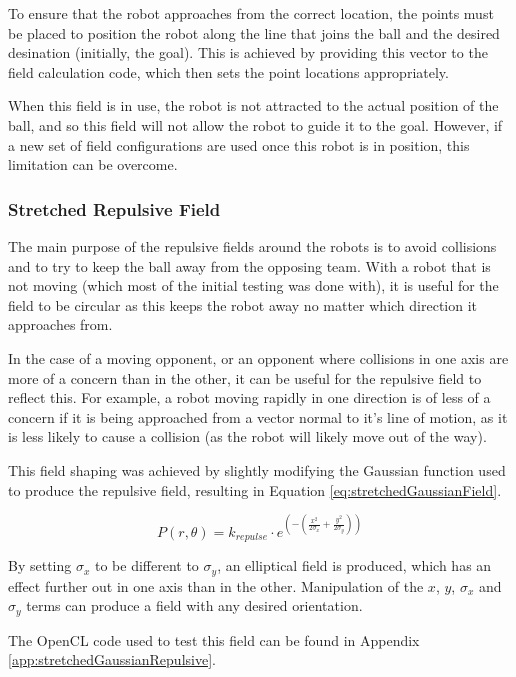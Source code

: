 \documentclass[10pt]{article}
\begin{document}
To ensure that the robot approaches from the correct location, the points must
be placed to position the robot along the line that joins the ball and the
desired desination (initially, the goal).  This is achieved by providing this
vector to the field calculation code, which then sets the point locations
appropriately.

When this field is in use, the robot is not attracted to the actual position of
the ball, and so this field will not allow the robot to guide it to the goal.
However, if a new set of field configurations are used once this robot is in
position, this limitation can be overcome.

\subsubsection{Stretched Repulsive Field}

The main purpose of the repulsive fields around the robots is to avoid
collisions and to try to keep the ball away from the opposing team.  With a
robot that is not moving (which most of the initial testing was done with), it
is useful for the field to be circular as this keeps the robot away no matter
which direction it approaches from.

In the case of a moving opponent, or an opponent where collisions in one axis
are more of a concern than in the other, it can be useful for the repulsive
field to reflect this.  For example, a robot moving rapidly in one direction is
of less of a concern if it is being approached from a vector normal to it's line
of motion, as it is less likely to cause a collision (as the robot will likely
move out of the way).

This field shaping was achieved by slightly modifying the Gaussian function used
to produce the repulsive field, resulting in Equation
\ref{eq:stretchedGaussianField}. 

\begin{equation}
P\left(r,\theta\right)=k_{repulse}\cdot
e^{\left(-\left(\frac{x^{2}}{2\sigma_x}+\frac{y^{2}}{2\sigma_y}\right)\right)}\label{eq:stretchedGaussianField}
\end{equation} 

By setting $\sigma_x$ to be different to $\sigma_y$, an elliptical field  is
produced, which has an effect further out in one axis than in the other. 
Manipulation of the $x$, $y$, $\sigma_x$ and $\sigma_y$ terms can produce a
field with any desired orientation.

The OpenCL code used to test this field can be found in Appendix
\ref{app:stretchedGaussianRepulsive}.
\end{document}
